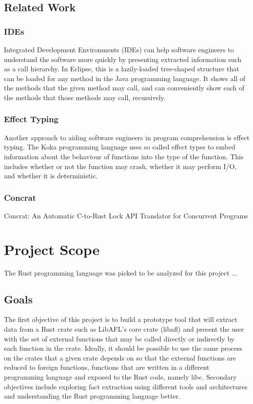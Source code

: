 \documentclass[11pt]{article}
\begin{document}
\subsection{Related Work}

\subsubsection{IDEs}

Integrated Development Environments (IDEs) can help software engineers to understand the software more quickly by presenting extracted information such as a call hierarchy.
In Eclipse, this is a lazily-loaded tree-shaped structure that can be loaded for any method in the Java programming language.
It shows all of the methods that the given method may call, and can conveniently show each of the methods that those methods may call, recursively.

\subsubsection{Effect Typing}

Another approach to aiding software engineers in program comprehension is effect typing.
The Koka programming language uses so called effect types to embed information about the behaviour of functions into the type of the function.
This includes whether or not the function may crash, whether it may perform I/O, and whether it is deterministic.

\subsubsection{Concrat}
Concrat: An Automatic C-to-Rust Lock API Translator for Concurrent Programs


\section{Project Scope}

The Rust programming language was picked to be analyzed for this project ...

\subsection{Goals}

The first objective of this project is to build a prototype tool that will extract data from a Rust crate such as LibAFL's core crate (libafl) and present the user with the set of external functions that may be called directly or indirectly by each function in the crate.
Ideally, it should be possible to use the same process on the crates that a given crate depends on so that the external functions are reduced to foreign functions, functions that are written in a different programming language and exposed to the Rust code, namely libc.
Secondary objectives include exploring fact extraction using different tools and architectures and understanding the Rust programming language better.
\end{document}
